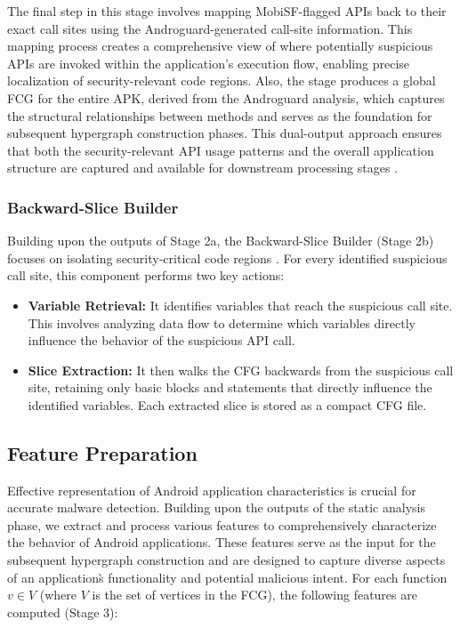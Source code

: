 \documentclass[runningheads]{llncs}
\begin{document}
The final step in this stage involves mapping MobiSF-flagged APIs back to their exact call sites using the Androguard-generated call-site information. This mapping process creates a comprehensive view of where potentially suspicious APIs are invoked within the application's execution flow, enabling precise localization of security-relevant code regions. Also, the stage produces a global FCG for the entire APK, derived from the Androguard analysis, which captures the structural relationships between methods and serves as the foundation for subsequent hypergraph construction phases. This dual-output approach ensures that both the security-relevant API usage patterns and the overall application structure are captured and available for downstream processing stages \cite{soi2024enhancing,li2022dmalnet}.

\subsubsection{Backward-Slice Builder}
Building upon the outputs of Stage 2a, the Backward-Slice Builder (Stage 2b) focuses on isolating security-critical code regions \cite{qian2025lamd}. For every identified suspicious call site, this component performs two key actions:
\begin{itemize}
    \item \textbf{Variable Retrieval:} It identifies variables that reach the suspicious call site. This involves analyzing data flow to determine which variables directly influence the behavior of the suspicious API call.
    \item \textbf{Slice Extraction:} It then walks the CFG backwards from the suspicious call site, retaining only basic blocks and statements that directly influence the identified variables. Each extracted slice is stored as a compact CFG file.
\end{itemize}
		
\subsection{Feature Preparation}
Effective representation of Android application characteristics is crucial for accurate malware detection. Building upon the outputs of the static analysis phase, we extract and process various features to comprehensively characterize the behavior of Android applications. These features serve as the input for the subsequent hypergraph construction and are designed to capture diverse aspects of an application\`s functionality and potential malicious intent. For each function $v \in V$ (where $V$ is the set of vertices in the FCG), the following features are computed (Stage 3):
\end{document}
